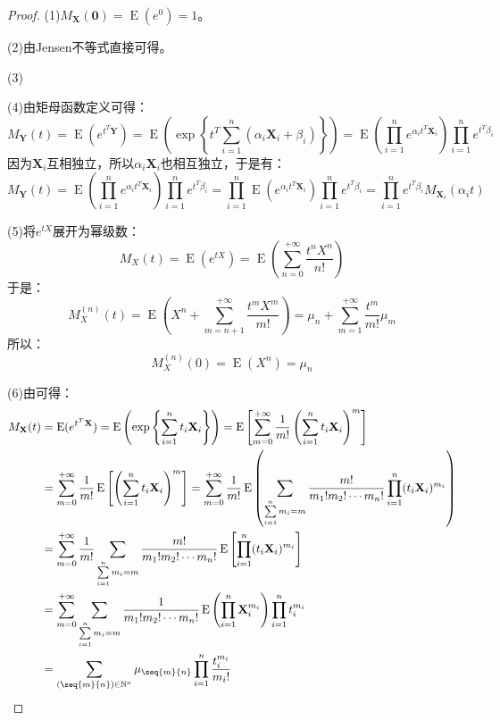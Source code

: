 \begin{proof}
	(1)$M_\mathbf{X}(\mathbf{0})=\operatorname{E}(e^0)=1$。\par
	(2)由Jensen不等式直接可得。\par
	(3)\par
	(4)由矩母函数定义可得：
	\begin{equation*}
		M_\mathbf{Y}(t)=\operatorname{E}(e^{t^T\mathbf{Y}})
		=\operatorname{E}\left(\exp\left\{t^T\sum_{i=1}^{n}(\alpha_i\mathbf{X}_i+\beta_i)\right\}\right)=\operatorname{E}\left(\prod_{i=1}^{n}e^{\alpha_it^T\mathbf{X}_i}\right)\prod_{i=1}^ne^{t^T\beta_i}
	\end{equation*}
	因为$\mathbf{X}_i$互相独立，所以$\alpha_i\mathbf{X}_i$也相互独立，于是有：
	\begin{equation*}
		M_\mathbf{Y}(t)=\operatorname{E}\left(\prod_{i=1}^{n}e^{\alpha_it^T\mathbf{X}_i}\right)\prod_{i=1}^ne^{t^T\beta_i}=\prod_{i=1}^{n}\operatorname{E}\left(e^{\alpha_it^T\mathbf{X}_i}\right)\prod_{i=1}^ne^{t^T\beta_i}=\prod_{i=1}^ne^{t^T\beta_i}M_{\mathbf{X}_i}(\alpha_it)
	\end{equation*}\par
	(5)将$e^{tX}$展开为幂级数：
	\begin{equation*}
		M_X(t)=\operatorname{E}(e^{tX})=\operatorname{E}\left(\sum_{n=0}^{+\infty}\frac{t^nX^n}{n!}\right)
	\end{equation*}
	于是：
	\begin{equation*}
		M_X^{(n)}(t)=\operatorname{E}\left(X^n+\sum_{m=n+1}^{+\infty}\frac{t^mX^m}{m!}\right)=\mu_n+\sum_{m=1}^{+\infty}\frac{t^m}{m!}\mu_m
	\end{equation*}
	所以：
	\begin{equation*}
		M_X^{(n)}(0)=\operatorname{E}(X^n)=\mu_n
	\end{equation*}\par
	(6)由可得：
	\begin{align*}
		M_\mathbf{X}(t)&=\operatorname{E}(e^{t^T\mathbf{X}})
		=\operatorname{E}\left(\exp\left\{\sum_{i=1}^{n}t_i\mathbf{X}_i\right\}\right)
		=\operatorname{E}\left[\sum_{m=0}^{+\infty}\frac{1}{m!}\left(\sum_{i=1}^{n}t_i\mathbf{X}_i\right)^m\right] \\
		&=\sum_{m=0}^{+\infty}\frac{1}{m!}\operatorname{E}\left[\left(\sum_{i=1}^{n}t_i\mathbf{X}_i\right)^m\right]
		=\sum_{m=0}^{+\infty}\frac{1}{m!}\operatorname{E}\left(\sum_{\sum\limits_{i=1}^{n}m_i=m}\frac{m!}{m_1!m_2!\cdots m_n!}\prod_{i=1}^{n}(t_i\mathbf{X}_i)^{m_i}\right) \\
		&=\sum_{m=0}^{+\infty}\frac{1}{m!}\sum_{\sum\limits_{i=1}^{n}m_i=m}\frac{m!}{m_1!m_2!\cdots m_n!}\operatorname{E}\left[\prod_{i=1}^{n}(t_i\mathbf{X}_i)^{m_i}\right] \\
		&=\sum_{m=0}^{+\infty}\sum_{\sum\limits_{i=1}^{n}m_i=m}\frac{1}{m_1!m_2!\cdots m_n!}\operatorname{E}\left(\prod_{i=1}^{n}\mathbf{X}_i^{m_i}\right)\prod_{i=1}^{n}t_i^{m_i} \\
		&=\sum_{(\seq{m}{n})\in\mathbb{N}^n}\mu_{\seq{m}{n}}\prod_{i=1}^{n}\frac{t_i^{m_i}}{m_i!}\qedhere
	\end{align*}
\end{proof}